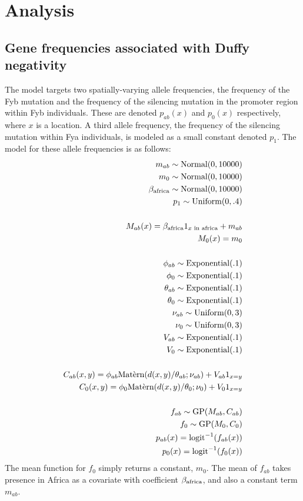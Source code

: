 \section*{Analysis}
 
\subsection*{Gene frequencies associated with Duffy negativity}
The model targets two spatially-varying allele frequencies, the frequency of the Fyb mutation and the frequency of the silencing mutation in the promoter region within Fyb individuals. These are denoted $p_{ab}(x)$ and $p_0(x)$ respectively, where $x$ is a location. A third allele frequency, the frequency of the silencing mutation within Fya individuals, is modeled as a small constant denoted $p_1$. The model for these allele frequencies is as follows:
\begin{eqnarray*}
    m_{ab} \sim \textup{Normal}(0,10000) \\
    m_0 \sim \textup{Normal}(0,10000)\\
    \beta_{\textup{africa}} \sim \textup{Normal}(0,10000)\\
    p_1\sim\textup{Uniform}(0,.4)\\
    \\
    M_{ab}(x) = \beta_{\textup{africa}} 1_{x\textup{\ in\ africa}} + m_{ab}\\
    M_0(x) = m_0\\
    \\
    \phi_{ab}\sim\textup{Exponential}(.1)\\
    \phi_{0}\sim\textup{Exponential}(.1)\\
    \theta_{ab}\sim\textup{Exponential}(.1)\\
    \theta_{0}\sim\textup{Exponential}(.1)\\
    \nu_{ab}\sim\textup{Uniform}(0,3)\\
    \nu_{0}\sim\textup{Uniform}(0,3)\\
    V_{ab}\sim\textup{Exponential}(.1)\\
    V_0\sim\textup{Exponential}(.1)\\
    \\
    C_{ab}(x,y) = \phi_{ab}\textup{Mat\`ern}(d(x,y)/\theta_{ab};\nu_{ab})+V_{ab}1_{x=y}\\
    C_{0}(x,y) = \phi_{0}\textup{Mat\`ern}(d(x,y)/\theta_{0};\nu_{0})+V_{0}1_{x=y}\\
    \\
    f_{ab}\sim\textup{GP}(M_{ab},C_{ab})\\
    f_{0}\sim\textup{GP}(M_{0},C_{0})\\
    p_{ab}(x)=\textup{logit}^{-1}(f_{ab}(x)) \\
    p_{0}(x)=\textup{logit}^{-1}(f_{0}(x))     
\end{eqnarray*}
The mean function for $f_0$ simply returns a constant, $m_0$. The mean of $f_{ab}$ takes presence in Africa as a covariate with coefficient $\beta_{\textup{africa}}$, and also a constant term $m_{ab}$. 

